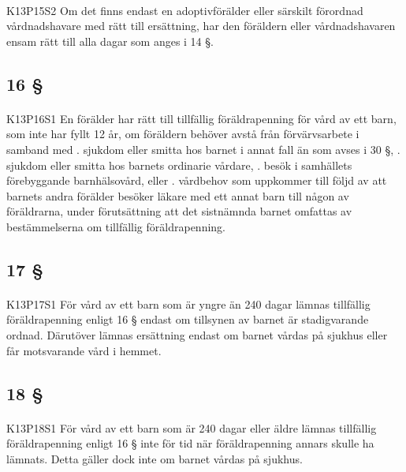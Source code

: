 \documentclass[a4paper,notitlepage,openany,10pt]{book}
\begin{document}
\paragraph*{}
{\tiny K13P15S2}
Om det finns endast en adoptivförälder eller särskilt förordnad vårdnadshavare med rätt till ersättning, har den föräldern eller vårdnadshavaren ensam rätt till alla dagar som anges i 14 §.
\subsection*{16 §}
\paragraph*{}
{\tiny K13P16S1}
En förälder har rätt till tillfällig föräldrapenning för vård av ett barn, som inte har fyllt 12 år, om föräldern behöver avstå från förvärvsarbete i samband med
. sjukdom eller smitta hos barnet i annat fall än som avses i 30 §,
. sjukdom eller smitta hos barnets ordinarie vårdare,
. besök i samhällets förebyggande barnhälsovård, eller
. vårdbehov som uppkommer till följd av att barnets andra förälder besöker läkare med ett annat barn till någon av föräldrarna, under förutsättning att det sistnämnda barnet omfattas av bestämmelserna om tillfällig föräldrapenning.
\subsection*{17 §}
\paragraph*{}
{\tiny K13P17S1}
För vård av ett barn som är yngre än 240 dagar lämnas tillfällig föräldrapenning enligt 16 § endast om tillsynen av barnet är stadigvarande ordnad. Därutöver lämnas ersättning endast om barnet vårdas på sjukhus eller får motsvarande vård i hemmet.
\subsection*{18 §}
\paragraph*{}
{\tiny K13P18S1}
För vård av ett barn som är 240 dagar eller äldre lämnas tillfällig föräldrapenning enligt 16 § inte för tid när föräldrapenning annars skulle ha lämnats. Detta gäller dock inte om barnet vårdas på sjukhus.
\end{document}
